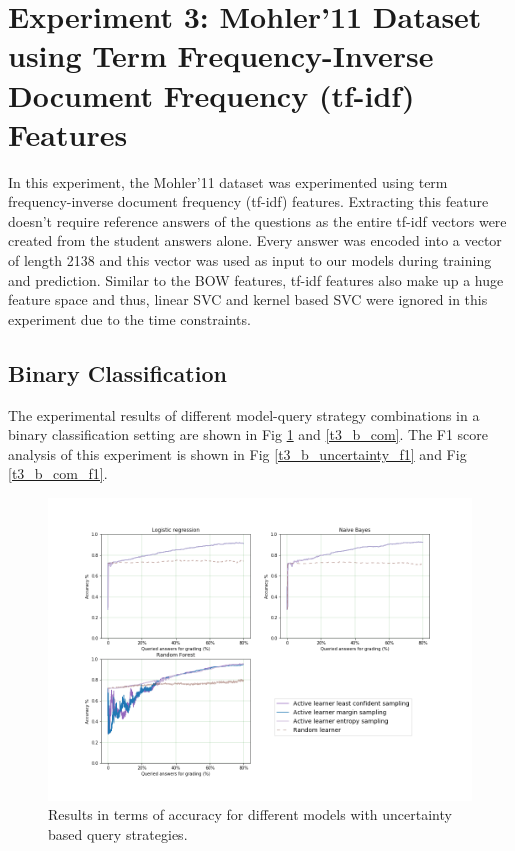 
\section{Experiment 3: Mohler'11 Dataset using Term Frequency-Inverse Document Frequency (tf-idf) Features}

In this experiment, the Mohler'11 dataset was experimented using term frequency-inverse document frequency (tf-idf) features. Extracting this feature doesn't require reference answers of the questions as the entire tf-idf vectors were created from the student answers alone. Every answer was encoded into a vector of length 2138 and this vector was used as input to our models during training and prediction. Similar to the BOW features, tf-idf features also make up a huge feature space and thus, linear SVC and kernel based SVC were ignored in this experiment due to the time constraints.    

\subsection{Binary Classification}

The experimental results of different model-query strategy combinations in a binary classification setting are shown in Fig \ref{t3_b_uncertainty} and \ref{t3_b_com}. The F1 score analysis of this experiment is shown in Fig \ref{t3_b_uncertainty_f1} and Fig \ref{t3_b_com_f1}. 

\begin{figure}[!htb]
	\centering
	\includegraphics[scale=0.46]{images/binary/task3_accuracy_uncertainty}
	\caption{Results in terms of accuracy for different models with uncertainty based query strategies.}
	\label{t3_b_uncertainty}
\end{figure}

